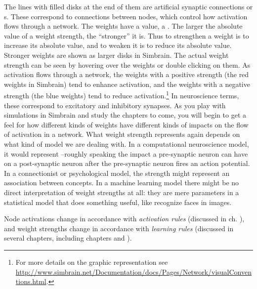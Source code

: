 
The lines with filled disks at the end of them are artificial synaptic connections or s. These correspond to connections between nodes, which control how activation flows through a network. The weights have a value, a . The larger the absolute value of a weight strength, the ``stronger'' it is.  Thus to strengthen a weight is to increase its absolute value, and to weaken it is to reduce its absolute value.  Stronger weights are shown as larger disks in Simbrain. The actual weight strength can be seen by hovering over the weights or double clicking on them.  As activation flows through a network, the weights with a positive strength (the red weights in Simbrain) tend to enhance activation, and the weights with a negative strength (the blue weights) tend to reduce activation.\footnote{For more details on the graphic representation see \url{http://www.simbrain.net/Documentation/docs/Pages/Network/visualConventions.html}.} In neuroscience terms, these correspond to excitatory and inhibitory synapses. As you play with simulations in Simbrain and study the chapters to come, you will begin to get a feel for how different kinds of weights have different kinds of impacts on the flow of activation in a network. What weight strength represents again depends on what kind of model we are dealing with. In a computational neuroscience model, it would represent --roughly speaking the impact a pre-synaptic neuron can have on a post-synaptic neuron after the pre-synaptic neuron fires an action potential. In a connectionist or psychological model, the strength might represent an association between concepts. In a machine learning model there might be no direct interpretation of weight strengths at all: they are mere parameters in a statistical model that does something useful, like recognize faces in images.

Node activations change in accordance with \emph{activation rules} (discussed in ch. ),  and weight strengths change in accordance with \emph{learning rules} (discussed in several chapters, including chapters  and  ). 

